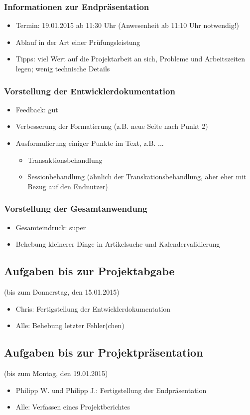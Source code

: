 \documentclass[12pt,a4paper]{article}
\begin{document}
\subsubsection*{Informationen zur Endpräsentation}
\begin{itemize}
\item Termin: 19.01.2015 ab 11:30 Uhr (Anwesenheit ab 11:10 Uhr notwendig!)
\item Ablauf in der Art einer Prüfungsleistung
\item Tipps: viel Wert auf die Projektarbeit an sich, Probleme und Arbeitszeiten legen; wenig technische Details
\end{itemize}

\subsubsection*{Vorstellung der Entwicklerdokumentation}
\begin{itemize}
\item Feedback: gut
\item Verbesserung der Formatierung (z.B. neue Seite nach Punkt 2)
\item Ausformulierung einiger Punkte im Text, z.B. ...
\begin{itemize}
\item Transaktionsbehandlung
\item Sessionbehandlung (ähnlich der Transkationsbehandlung, aber eher mit Bezug auf den Endnutzer)
\end{itemize}
\end{itemize}

\subsubsection*{Vorstellung der Gesamtanwendung}
\begin{itemize}
\item Gesamteindruck: super
\item Behebung kleinerer Dinge in Artikelsuche und Kalendervalidierung
\end{itemize}

\subsection*{Aufgaben bis zur Projektabgabe}
(bis zum Donnerstag, den 15.01.2015)
\medskip
\begin{itemize}
\item Chris: Fertigstellung der Entwicklerdokumentation
\item Alle: Behebung letzter Fehler(chen)
\end{itemize}

\subsection*{Aufgaben bis zur Projektpräsentation}
(bis zum Montag, den 19.01.2015)
\medskip
\begin{itemize}
\item Philipp W. und Philipp J.: Fertigstellung der Endpräsentation
\item Alle: Verfassen eines Projektberichtes
\end{itemize}
\end{document}

